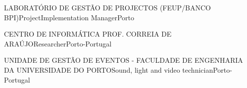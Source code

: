 

\begin{cventries}
  \cventry
{LABORATÓRIO DE GESTÃO DE PROJECTOS (FEUP/BANCO BPI)}{Project\/Implementation Manager}{Porto}{}
{\begin{cvitems}
\item {}
\end{cvitems}}
  \cventry
{CENTRO DE INFORMÁTICA PROF. CORREIA DE ARAÚJO}{Researcher}{Porto-Portugal}{{}}
{}\end{cventries}

\begin{cventries}
  \cventry
{UNIDADE DE GESTÃO DE EVENTOS - FACULDADE DE ENGENHARIA DA UNIVERSIDADE DO PORTO}{Sound, light and video technician}{Porto-Portugal}{{}}
{}\end{cventries}
